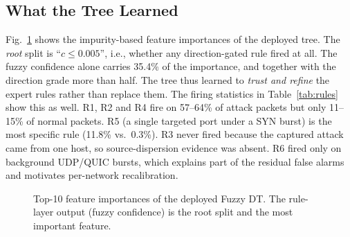 \documentclass[conference]{IEEEtran}
\begin{document}
\subsection{What the Tree Learned}
Fig.~\ref{fig:importance} shows the impurity-based feature importances of the deployed tree. The \emph{root} split is ``$c\le0.005$'', i.e., whether any direction-gated rule fired at all. The fuzzy confidence alone carries 35.4\% of the importance, and together with the direction grade more than half. The tree thus learned to \emph{trust and refine} the expert rules rather than replace them. The firing statistics in Table~\ref{tab:rules} show this as well. R1, R2 and R4 fire on 57--64\% of attack packets but only 11--15\% of normal packets. R5 (a single targeted port under a SYN burst) is the most specific rule (11.8\% vs.\ 0.3\%). R3 never fired because the captured attack came from one host, so source-dispersion evidence was absent. R6 fired only on background UDP/QUIC bursts, which explains part of the residual false alarms and motivates per-network recalibration.

\begin{figure}[t]
\centering
{}
\caption{Top-10 feature importances of the deployed Fuzzy DT. The rule-layer output (fuzzy confidence) is the root split and the most important feature.}
\label{fig:importance}
\end{figure}
\end{document}

